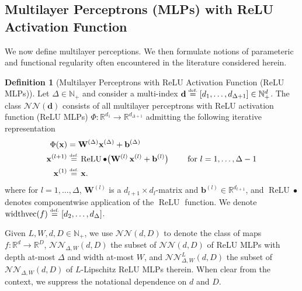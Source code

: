 \documentclass{article}
\numberwithin{equation}{section}
\theoremstyle{definition}
\newtheorem{definition}{Definition}[section]
\newcommand{\eqdef}{\ensuremath{\stackrel{\mbox{\upshape\tiny def.}}{=}}}
\begin{document}
\subsection{Multilayer Perceptrons (MLPs) with ReLU Activation Function}
\label{s:Prelim__ss:Notation___sss:MLP}
We now define multilayer perceptions.  We then formulate notions of parameteric and functional regularity often encountered in the literature considered herein.  
\begin{definition}[Multilayer Perceptrons with ReLU Activation Function (ReLU MLPs)]
\label{defn:ReLUMLP}
Let $\Delta \in \mathbb{N}_+$ and consider a multi-index $\mathbf{d}\eqdef [d_1,\dots,d_{\Delta+1}]\in \mathbb{N}_+^d$.  
The class $\mathcal{NN}(\mathbf{d})$ consists of all multilayer perceptrons with ReLU activation function (ReLU MLPs) $\Phi:\mathbb{R}^{d_1}\to\mathbb{R}^{d_{\Delta+1}}$ admitting the following iterative representation
\begin{equation}
\label{eq:MLPRepresentation}
    \begin{aligned}
        \Phi(\mathbf{x}) & = \mathbf{W}^{(\Delta)} \mathbf{x}^{(\Delta)}+\mathbf{b}^{(\Delta)}\\
     \mathbf{x}^{(l+1)}& \eqdef \operatorname{ReLU} \bullet\big(\mathbf{W}^{(l)}\,\mathbf{x}^{(l)} + \mathbf{b}^{(l)}\big) 
        \qquad
        \mbox{ for } l=1,\dots,\Delta-1
    \\
    \mathbf{x}^{(1)} & \eqdef  \mathbf{x}.
    \end{aligned}
\end{equation}
where for $l=1,\dots,\Delta$, $\mathbf{W}^{(l)}$ is a $d_{l+1}\times d_l$-matrix and $\mathbf{b}^{(l)}\in \mathbb{R}^{d_{l+1}}$, and $\operatorname{ReLU}\bullet$ denotes componentwise application of the $\operatorname{ReLU}$ function.  We denote $\operatorname{widthvec}(f)\eqdef[d_2,\dots,d_{\Delta}]$.

Given $L,W,d,D\in \mathbb{N}_+$, we use $\mathcal{NN}(d,D)$ to denote the class of maps $f:\mathbb{R}^d\to \mathbb{R}^D$, $\mathcal{NN}_{\Delta,W}(d,D)$ the subset of $\mathcal{NN}(d,D)$ of ReLU MLPs with depth at-most $\Delta$ and width at-most $W$, and $\mathcal{NN}_{\Delta,W}^L(d,D)$ the subset of $\mathcal{NN}_{\Delta,W}(d,D)$ of $L$-Lipschitz ReLU MLPs therein.  When clear from the context, we suppress the notational dependence on $d$ and $D$.
\end{definition}
\end{document}
